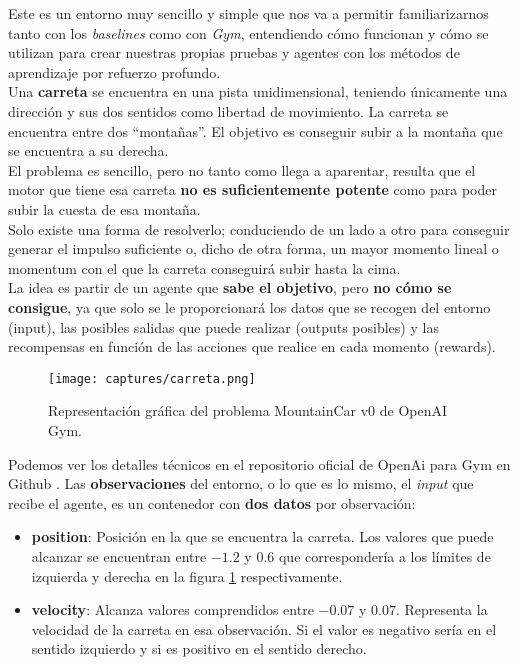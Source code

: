 \documentclass[11pt,fleqn]{book} %
\begin{document}
Este es un entorno muy sencillo y simple que nos va a permitir familiarizarnos tanto con los \textit{baselines} como con \textit{Gym}, entendiendo cómo funcionan y cómo se utilizan para crear nuestras propias pruebas y agentes con los métodos de aprendizaje por refuerzo profundo. \\

Una \textbf{carreta} se encuentra en una pista unidimensional, teniendo únicamente una dirección y sus dos sentidos como libertad de movimiento. La carreta se encuentra entre dos ``montañas''. El objetivo es conseguir subir a la montaña que se encuentra a su derecha. \\

El problema es sencillo, pero no tanto como llega a aparentar, resulta que el motor que tiene esa carreta \textbf{no es suficientemente potente} como para poder subir la cuesta de esa montaña. \\

Solo existe una forma de resolverlo; conduciendo de un lado a otro para conseguir generar el impulso suficiente o, dicho de otra forma, un mayor momento lineal o momentum con el que la carreta conseguirá subir hasta la cima. \\

La idea es partir de un agente que \textbf{sabe el objetivo}, pero \textbf{no cómo se consigue}, ya que solo se le proporcionará los datos que se recogen del entorno (input), las posibles salidas que puede realizar (outputs posibles) y las recompensas en función de las acciones que realice en cada momento (rewards). \\

\begin{figure}[H]
	\centering\texttt{[image: captures/carreta.png]}
	\caption{Representación gráfica del problema MountainCar v0 de OpenAI Gym.}
	\label{fig:carreta} %
\end{figure}

Podemos ver los detalles técnicos en el repositorio oficial de OpenAi para Gym en Github \cite{article:mountain2}. Las \textbf{observaciones} del entorno, o lo que es lo mismo, el \textit{input} que recibe el agente, es un contenedor con \textbf{dos datos} por observación: \\

\begin{itemize}
	\item \textbf{position}: Posición en la que se encuentra la carreta. Los valores que puede alcanzar se encuentran entre $-1.2$ y $0.6$ que correspondería a los límites de izquierda y derecha en la figura \ref{fig:carreta} respectivamente. \\
	
	\item \textbf{velocity}: Alcanza valores comprendidos entre $-0.07$ y $0.07$. Representa la velocidad de la carreta en esa observación. Si el valor es negativo sería en el sentido izquierdo y si es positivo en el sentido derecho. \\
\end{itemize}
\end{document}
